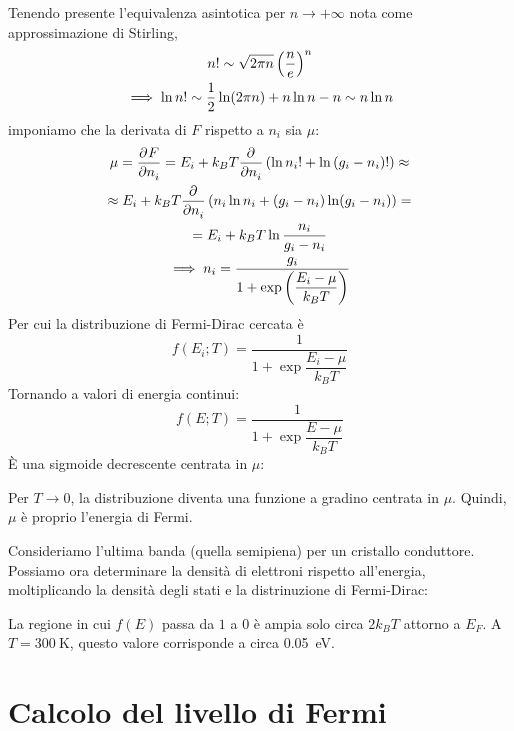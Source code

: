 Tenendo presente l'equivalenza asintotica per $n \to+\infty$ nota come approssimazione di Stirling,
\begin{gather}
    n! \sim \sqrt{2 \pi n} \left( \frac{n}{e} \right)^n \\
    \implies \ln n! \sim \frac{1}{2} \ln(2 \pi n) +  n \ln n - n \sim n \ln n
\end{gather}
imponiamo che la derivata di $F$ rispetto a $n_i$ sia $\mu$:
\begin{gather}
\begin{gathered}
    \mu = \parder[F]{n_i}
    = E_i + k_B T \parder{n_i} \pts{\ln n_i! + \ln{(g_i - n_i)!}} \approx \\
    \approx E_i + k_B T \parder{n_i} \pts{n_i \ln n_i + (g_i - n_i) \ln(g_i - n_i)} = \\
    = E_i + k_B T \ln \frac{n_i}{g_i - n_i}
\end{gathered} \\
    \implies n_i = \frac{g_i}{1 + \exp{\dfrac{E_i - \mu}{k_B T}}}
\end{gather}
Per cui la distribuzione di Fermi-Dirac cercata è
\begin{equation}
    f(E_i; T) = \frac{1}{1 + \exp{\dfrac{E_i - \mu}{k_B T}}}
\end{equation}
Tornando a valori di energia continui:
\begin{equation}
    \boxed{
    f(E; T) = \frac{1}{1 + \exp{\dfrac{E - \mu}{k_B T}}}
    }
\end{equation}
È una sigmoide decrescente centrata in $\mu$:


Per $T \to 0$, la distribuzione diventa una funzione a gradino centrata in $\mu$.
Quindi, $\mu$ è proprio l'energia di Fermi.

Consideriamo l'ultima banda (quella semipiena) per un cristallo conduttore.
Possiamo ora determinare la densità di elettroni rispetto all'energia, moltiplicando la densità degli stati e la distrinuzione di Fermi-Dirac:


La regione in cui $f(E)$ passa da $1$ a $0$ è ampia solo circa $2 k_B T$ attorno a $E_F$.
A $T = \qty{300}{\kelvin}$, questo valore corrisponde a circa \qty{0.05}{\electronvolt}.

\section{Calcolo del livello di Fermi}

